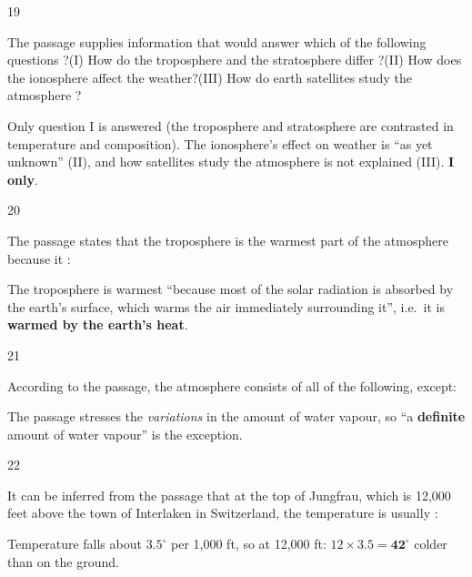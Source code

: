 \begin{question}{19}
{The passage supplies information that would answer which of the following questions ?\newline (I) How do the troposphere and the stratosphere differ ?\newline (II) How does the ionosphere affect the weather?\newline (III) How do earth satellites study the atmosphere ?\par}
\begin{explain}
Only question I is answered (the troposphere and stratosphere are contrasted in temperature and composition). The ionosphere's effect on weather is ``as yet unknown'' (II), and how satellites study the atmosphere is not explained (III). \textbf{I only}.
\end{explain}
\end{question}

\begin{question}{20}
{The passage states that the troposphere is the warmest part of the atmosphere because it :\par}
\begin{explain}
The troposphere is warmest ``because most of the solar radiation is absorbed by the earth's surface, which warms the air immediately surrounding it'', i.e.\ it is \textbf{warmed by the earth's heat}.
\end{explain}
\end{question}

\begin{question}{21}
{According to the passage, the atmosphere consists of all of the following, except:\par}
\begin{explain}
The passage stresses the \emph{variations} in the amount of water vapour, so ``a \textbf{definite} amount of water vapour'' is the exception.
\end{explain}
\end{question}

\begin{question}{22}
{It can be inferred from the passage that at the top of Jungfrau, which is 12,000 feet above the town of Interlaken in Switzerland, the temperature is usually :\par}
\begin{explain}
Temperature falls about $3.5^\circ$ per 1,000 ft, so at 12,000 ft: $12\times3.5=\mathbf{42}^\circ$ colder than on the ground.
\end{explain}
\end{question}


